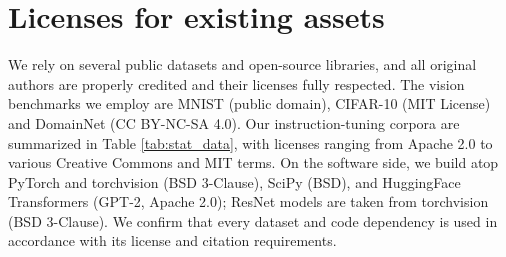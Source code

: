\section{Licenses for existing assets}
\label{appendix:license}
We rely on several public datasets and open-source libraries, and all original authors are properly credited and their licenses fully respected. The vision benchmarks we employ are MNIST (public domain), CIFAR-10 (MIT License) and DomainNet (CC BY-NC-SA 4.0). Our instruction-tuning corpora are summarized in Table \ref{tab:stat_data}, with licenses ranging from Apache 2.0 to various Creative Commons and MIT terms. On the software side, we build atop PyTorch and torchvision (BSD 3-Clause), SciPy (BSD), and HuggingFace Transformers (GPT-2, Apache 2.0); ResNet models are taken from torchvision (BSD 3-Clause). We confirm that every dataset and code dependency is used in accordance with its license and citation requirements.